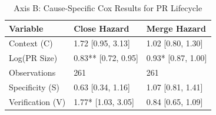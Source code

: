 \begin{table}
\caption{Axis B: Cause-Specific Cox Results for PR Lifecycle}
\label{tab:axisb}
\begin{tabular}{lll}
\toprule
Variable & Close Hazard & Merge Hazard \\
\midrule
Context (C) & 1.72 [0.95, 3.13] & 1.02 [0.80, 1.30] \\
Log(PR Size) & 0.83** [0.72, 0.95] & 0.93* [0.87, 1.00] \\
Observations & 261 & 261 \\
Specificity (S) & 0.63 [0.34, 1.16] & 1.07 [0.81, 1.41] \\
Verification (V) & 1.77* [1.03, 3.05] & 0.84 [0.65, 1.09] \\
\bottomrule
\end{tabular}
\end{table}
